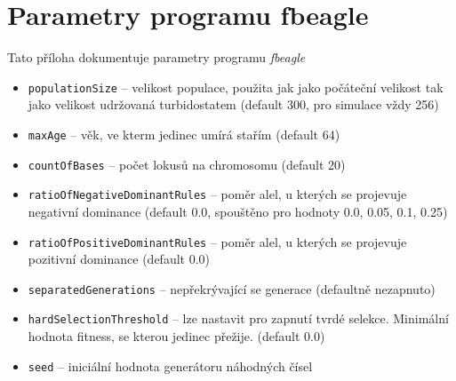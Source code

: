 \section{Parametry programu fbeagle}
\label{sec:parameters}

Tato příloha dokumentuje parametry programu \textit{fbeagle}

\begin{itemize}
  \item \texttt{\-\-populationSize} -- velikost populace, použita jak jako počáteční velikost tak jako velikost udržovaná turbidostatem (default 300, pro simulace vždy 256)
  \item \texttt{\-\-maxAge} -- věk, ve kterm jedinec umírá stařím (default 64)
  \item \texttt{\-\-countOfBases} -- počet lokusů na chromosomu (default 20)
  \item \texttt{\-\-ratioOfNegativeDominantRules} -- poměr alel, u kterých se projevuje negativní dominance (default 0.0, spouštěno pro hodnoty 0.0, 0.05, 0.1, 0.25)
  \item \texttt{\-\-ratioOfPositiveDominantRules} -- poměr alel, u kterých se projevuje pozitivní dominance (default 0.0)
  \item \texttt{\-\-separatedGenerations} -- nepřekrývající se generace (defaultně nezapnuto)
  \item \texttt{\-\-hardSelectionThreshold} -- lze nastavit pro zapnutí tvrdé selekce. Minimální hodnota fitness, se kterou jedinec přežije. (default 0.0)
  \item \texttt{\-\-seed} -- iniciální hodnota generátoru náhodných čísel
\end{itemize}
